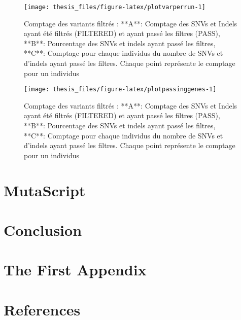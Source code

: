 \documentclass[12pt,twoside]{reedthesis}
\theoremstyle{definition}
\theoremstyle{definition}
\theoremstyle{remark}
\begin{document}
  \begin{figure}
  
  {\centering \texttt{[image: thesis\_files/figure-latex/plotvarperrun-1]} 
  
  }
  
  \caption[Comptage des variants filtrés]{Comptage des variants filtrés  :  **A**: Comptage des SNVs et Indels ayant été filtrés (FILTERED) et ayant passé les filtres (PASS), **B**: Pourcentage des SNVs et indels ayant passé les filtres, **C**: Comptage pour chaque individus du nombre de SNVs et d'indels ayant passé les filtres. Chaque point représente le comptage pour un individus}\label{fig:plotvarperrun}
  \end{figure}
  
  \begin{figure}
  
  {\centering \texttt{[image: thesis\_files/figure-latex/plotpassinggenes-1]} 
  
  }
  
  \caption[Analyse des gènes passant les filtres]{Comptage des variants filtrés  :  **A**: Comptage des SNVs et Indels ayant été filtrés (FILTERED) et ayant passé les filtres (PASS), **B**: Pourcentage des SNVs et indels ayant passé les filtres, **C**: Comptage pour chaque individus du nombre de SNVs et d'indels ayant passé les filtres. Chaque point représente le comptage pour un individus}\label{fig:plotpassinggenes}
  \end{figure}
  
  \chapter{MutaScript}\label{mutascript}
  
  \chapter*{Conclusion}\label{conclusion}
  
  \chapter{The First Appendix}\label{the-first-appendix}
  
  \chapter*{References}\label{references}
  
\end{document}
